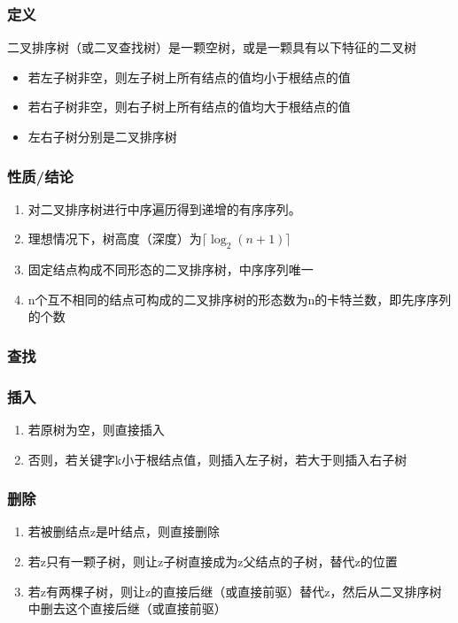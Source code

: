\subsubsection{定义}
二叉排序树（或二叉查找树）是一颗空树，或是一颗具有以下特征的二叉树
\begin{itemize}
    \item 若左子树非空，则左子树上所有结点的值均小于根结点的值
    \item 若右子树非空，则右子树上所有结点的值均大于根结点的值
    \item 左右子树分别是二叉排序树
\end{itemize}


\subsubsection{性质/结论}
\begin{enumerate}
    \item 对二叉排序树进行中序遍历得到递增的有序序列。
    \item 理想情况下，树高度（深度）为\(\lceil\log_2(n + 1)\rceil\)
    \item 固定结点构成不同形态的二叉排序树，中序序列唯一
    \item n个互不相同的结点可构成的二叉排序树的形态数为n的卡特兰数，即先序序列的个数
\end{enumerate}




\subsubsection{查找}


\subsubsection{插入}
\begin{enumerate}
    \item 若原树为空，则直接插入
    \item 否则，若关键字k小于根结点值，则插入左子树，若大于则插入右子树
\end{enumerate}

\subsubsection{删除}
\begin{enumerate}
    \item 若被删结点z是叶结点，则直接删除
    \item 若z只有一颗子树，则让z子树直接成为z父结点的子树，替代z的位置
    \item 若z有两棵子树，则让z的直接后继（或直接前驱）替代z，然后从二叉排序树中删去这个直接后继（或直接前驱）
\end{enumerate}

